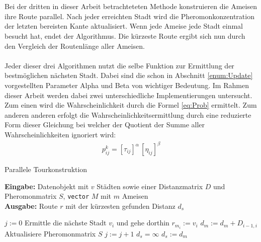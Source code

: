 \documentclass[doktyp=barbeit, sprache=german]{TUBAFarbeiten}
\begin{document}
\\\\Bei der dritten in dieser Arbeit betrachteteten Methode konstruieren die Ameisen ihre Route parallel. Nach jeder erreichten Stadt wird die Pheromonkonzentration der letzten bereisten Kante aktualisiert. Wenn jede Ameise jede Stadt einmal besucht hat, endet der Algorithmus. Die kürzeste Route ergibt sich nun durch den Vergleich der Routenlänge aller Ameisen.
\\\\Jeder dieser drei Algorithmen nutzt die selbe Funktion zur Ermittlung der bestmöglichen nächsten Stadt. Dabei sind die schon in Abschnitt \ref{enum:Update} vorgestellten Parameter Alpha und Beta von wichtiger Bedeutung. Im Rahmen dieser Arbeit werden dabei zwei unterschiedliche Implementierungen untersucht. Zum einen wird die Wahrscheinlichkeit durch die Formel \ref{eq:Prob} ermittelt. Zum anderen anderen erfolgt die Wahrscheinlichkeitsermittlung durch eine reduzierte Form dieser Gleichung bei welcher der Quotient der Summe aller Wahrscheinlichkeiten ignoriert wird:
\begin{align}
\label{eq:ProbSimple}
p^k_{ij} = [\tau_{ij}]^\alpha \, [\eta_{ij}]^\beta
\end{align}
\begin{algorithm}
\caption{Parallele Tourkonstruktion}
\label{ParallelTour}
\textbf{Eingabe:} Datenobjekt mit $v$ Städten sowie einer Distanzmatrix $D$ und Pheromonmatrix $S$, \texttt{vector} $M$ mit $m$ Ameisen
\\\textbf{Ausgabe:} Route $r$ mit der kürzesten gefunden Distanz $d_s$
\begin{algorithmic}[1]
\State $j := 0$
\State Ermittle die nächste Stadt $v_i$ und gehe dorthin
\State $r_{m_i} := v_i$
\State $d_m := d_m + D_{i-1,i}$
\State Aktualisiere Pheromonmatrix $S$
\EndFor
\State $j := j + 1$
\EndWhile
\State $d_s = \infty$
\State $d_s := d_m$
\EndIf
\EndFor
\end{algorithmic}
\end{algorithm}
\end{document}
